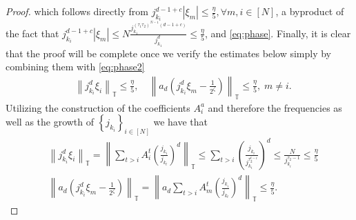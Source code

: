 \documentclass[12pt,leqno]{amsart}
\newcommand{\TT}{\mathbb{ T} }
\numberwithin{equation}{section}
\numberwithin{counter2}{section}
\theoremstyle{definition}
\theoremstyle{plain}
\begin{document}
\begin{proof}
		which follows directly  from $j_{k_i}^{d-1+c}|\xi_m| \leq  \frac{\eta}{5}, \forall m,i \in [N] $,   a byproduct of the fact that $ j_{k_i}^{d-1+c}|\xi_m| \leq   N \frac{j_{k_1}^{(\tau_1\tau_2)^{N-1}(d-1+c)}}{j_{k_1}^d} \leq \frac{\eta}{5}$,  and \eqref{eq:phase}. Finally, it is clear that the proof will be complete once we verify the estimates below simply by combining them with \eqref{eq:phase2}   \[ \begin{split}
			&	\left \| j_{k_i}^d \xi_i \right \|_{\TT} \leq \frac{\eta }{5}, \quad  \left \| a_{d} \left( j_{k_i}^d \xi_m-\frac{1}{2^{\zeta}} \right) \right \|_{\TT} \leq \frac{\eta}{5}, \; m \neq i.
		\end{split}  \] Utilizing the construction of the coefficients $A_{i}^a$ and therefore the frequencies as well as the growth of $\left\{j_{k_i}\right\}_{i \in [N]}$ we have that \[ \begin{split}
			&\left \| j_{k_i}^d \xi_i \right \|_{\TT}= \left \| \sum_{t > i } A_{i}^t \left(\frac{j_{k_i}}{j_{k_t}}\right)^d \right \|_{\TT}  \leq \sum_{t>i} \left(\frac{j_{k_i}}{j_{k_i}^{\tau_2^{t-i}}}\right)^d \leq \frac{N}{j_{k_i}^{\tau_2-1}} \leq \frac{\eta}{5} \\ & \left\| a_d \left( j_{k_i}^d \xi_m-\frac{1}{2^{\zeta}} \right) \right\|_{\TT}= \left \| a_d \sum_{t>i} A_{m}^t\left(\frac{j_{k_i}}{j_{k_t}}\right)^d   \right \|_{\TT} \leq \frac{\eta}{5}.
		\end{split} \]
	\end{proof}
	
	
	
\end{document}
